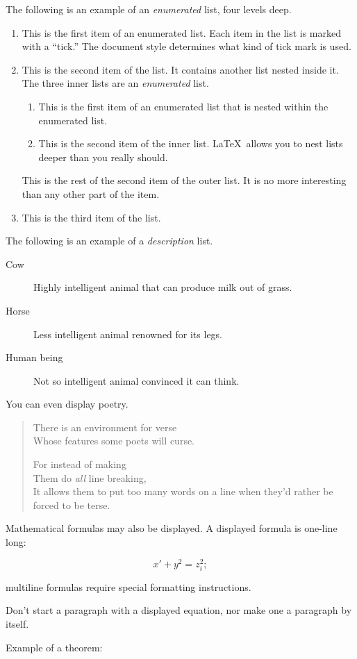 \documentclass[book, 12pt]{phd}
\begin{document}
The following is an example of an {\em enumerated} list, four levels deep.
\begin{enumerate}
\item  This is the first item of an enumerated list.  Each item
      in the list is marked with a ``tick.''  The document
      style determines what kind of tick mark is used.
\item  This is the second item of the list.  It contains another
      list nested inside it.  The three inner lists are an {\em enumerated}
      list.
    \begin{enumerate}
       \item This is the first item of an enumerated list that
            is nested within the enumerated list.
          \item This is the second item of the inner list.  \LaTeX\
            allows you to nest lists deeper than you really should.
      \end{enumerate}
      This is the rest of the second item of the outer list.  It
      is no more interesting than any other part of the item.
   \item  This is the third item of the list.
\end{enumerate}


The following is an example of a {\em description} list.
\begin{description}
\item[Cow] Highly intelligent animal that can produce milk out of grass.
\item[Horse] Less intelligent animal renowned for its legs.
\item[Human being] Not so intelligent animal convinced it can think.
\end{description}

You can even display poetry.
\begin{verse}
   There is an environment for verse \\    %
   Whose features some poets will curse.   %


   For instead of making\\
   Them do {\em all\/} line breaking, \\
   It allows them to put too many words on a line when they'd
   rather be forced to be terse.
\end{verse}

Mathematical formulas may also be displayed.  A displayed formula is
one-line long:

   \[  x' + y^{2} = z_{i}^{2};\]

multiline formulas require special formatting
instructions.

Don't start a paragraph with a displayed equation, nor make
one a paragraph by itself.

Example of a theorem:
\end{document}

